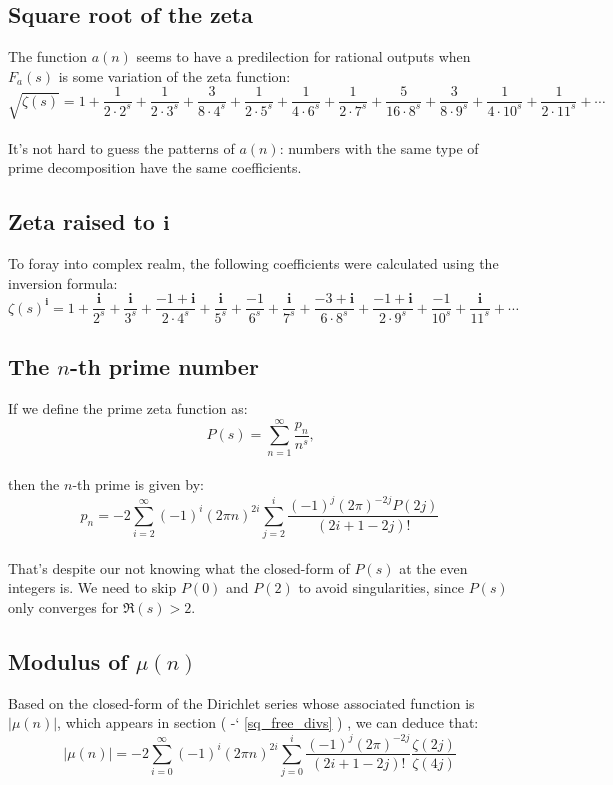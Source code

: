\documentclass[12pt]{article}
\newcommand*{\secrefe}[1]{%
\begingroup
(\color{Aquamarine}
\romannumeral-`\x %
\setcitestyle{numbers}%
\ref{#1}%
\endgroup
)\ignorespacesafterend
}
\newcommand{\ii}{\bm{i}}
\begin{document}
\subsection{Square root of the zeta}
The function $a(n)$ seems to have a predilection for rational outputs when $F_a(s)$ is some variation of the zeta function:
\begin{equation} \nonumber
\sqrt{\zeta(s)}=1+\frac{1}{2\cdot 2^s}+\frac{1}{2\cdot 3^s}+\frac{3}{8\cdot 4^s}+\frac{1}{2\cdot 5^s}+\frac{1}{4\cdot 6^s}+\frac{1}{2\cdot 7^s} +\frac{5}{16\cdot 8^s}
+\frac{3}{8\cdot 9^s}+\frac{1}{4\cdot 10^s}+\frac{1}{2\cdot 11^s}+\cdots
\end{equation}\\
\indent It's not hard to guess the patterns of $a(n)$: numbers with the same type of prime decomposition have the same coefficients.

\subsection{Zeta raised to $\ii$}
\indent To foray into complex realm, the following coefficients were calculated using the inversion formula:
\begin{equation} \nonumber
\zeta(s)^{\ii}=1+\frac{\ii}{2^s}+\frac{\ii}{3^s}+\frac{-1+\ii}{2\cdot 4^s}+\frac{\ii}{5^s}+\frac{-1}{6^s}+\frac{\ii}{7^s} +\frac{-3+\ii}{6\cdot 8^s}+\frac{-1+\ii}{2\cdot 9^s}+\frac{-1}{10^s}+\frac{\ii}{11^s}+\cdots
\end{equation} 

\subsection{The $n$-th prime number}
If we define the prime zeta function as:
\begin{equation} \nonumber
P(s)=\sum_{n=1}^{\infty}\frac{p_n}{n^s} \text{,}
\end{equation}\\
\noindent then the $n$-th prime is given by:
\begin{equation} \nonumber
p_n=-2\sum_{i=2}^{\infty} (-1)^{i}(2\pi n)^{2i}\sum_{j=2}^{i}\frac{(-1)^j (2\pi)^{-2j}P(2j)}{(2i+1-2j)!}
\end{equation}\\
\indent That's despite our not knowing what the closed-form of $P(s)$ at the even integers is. We need to skip $P(0)$ and $P(2)$ to avoid singularities, since $P(s)$ only converges for $\Re(s)>2$. 

\subsection{Modulus of $\mu(n)$}
\indent Based on the closed-form of the Dirichlet series whose associated function is $|\mu(n)|$, which appears in section \secrefe{sq_free_divs}, we can deduce that: 
\begin{equation} \nonumber
|\mu(n)|=-2\sum_{i=0}^{\infty} (-1)^{i}(2\pi n)^{2i}\sum_{j=0}^{i}\frac{(-1)^j (2\pi)^{-2j}}{(2i+1-2j)!}\frac{\zeta(2j)}{\zeta(4j)}
\end{equation}
\end{document}
